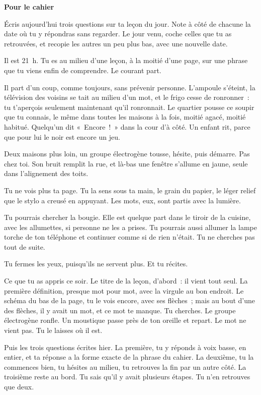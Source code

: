 \documentclass[10.5pt,twoside,openright]{book}
\newenvironment{pourcahier}[1]{\par\vspace{0.9em}\begin{tcolorbox}[colback=black!4,colframe=accent,boxrule=0pt,leftrule=2.2pt,arc=0pt,left=8pt,right=8pt,top=5pt,bottom=5pt]\small\textbf{#1}\par\smallskip}{\end{tcolorbox}\par}
\newcommand{\chapitresn}[1]{\cleardoublepage\markright{#1}\thispagestyle{plain}\vspace*{2.8cm}{\noindent\LARGE\bfseries #1\par}\vspace{1.6em}\noindent\ignorespaces}
\begin{document}
\begin{pourcahier}{Pour le cahier}
Écris aujourd’hui trois questions sur ta leçon du jour. Note à côté de chacune la date où tu y répondras sans regarder. Le jour venu, coche celles que tu as retrouvées, et recopie les autres un peu plus bas, avec une nouvelle date.
\end{pourcahier}


\chapitresn{Interlude — Vingt et une heures}

Il est 21 h. Tu es au milieu d’une leçon, à la moitié d’une page, sur une phrase que tu viens enfin de comprendre. Le courant part.

Il part d’un coup, comme toujours, sans prévenir personne. L’ampoule s’éteint, la télévision des voisins se tait au milieu d’un mot, et le frigo cesse de ronronner : tu t’aperçois seulement maintenant qu’il ronronnait. Le quartier pousse ce soupir que tu connais, le même dans toutes les maisons à la fois, moitié agacé, moitié habitué. Quelqu’un dit « Encore ! » dans la cour d’à côté. Un enfant rit, parce que pour lui le noir est encore un jeu.

Deux maisons plus loin, un groupe électrogène tousse, hésite, puis démarre. Pas chez toi. Son bruit remplit la rue, et là-bas une fenêtre s’allume en jaune, seule dans l’alignement des toits.

Tu ne vois plus ta page. Tu la sens sous ta main, le grain du papier, le léger relief que le stylo a creusé en appuyant. Les mots, eux, sont partis avec la lumière.

Tu pourrais chercher la bougie. Elle est quelque part dans le tiroir de la cuisine, avec les allumettes, si personne ne les a prises. Tu pourrais aussi allumer la lampe torche de ton téléphone et continuer comme si de rien n’était. Tu ne cherches pas tout de suite.

Tu fermes les yeux, puisqu’ils ne servent plus. Et tu récites.

Ce que tu as appris ce soir. Le titre de la leçon, d’abord : il vient tout seul. La première définition, presque mot pour mot, avec la virgule au bon endroit. Le schéma du bas de la page, tu le vois encore, avec ses flèches ; mais au bout d’une des flèches, il y avait un mot, et ce mot te manque. Tu cherches. Le groupe électrogène ronfle. Un moustique passe près de ton oreille et repart. Le mot ne vient pas. Tu le laisses où il est.

Puis les trois questions écrites hier. La première, tu y réponds à voix basse, en entier, et ta réponse a la forme exacte de la phrase du cahier. La deuxième, tu la commences bien, tu hésites au milieu, tu retrouves la fin par un autre côté. La troisième reste au bord. Tu sais qu’il y avait plusieurs étapes. Tu n’en retrouves que deux.
\end{document}
